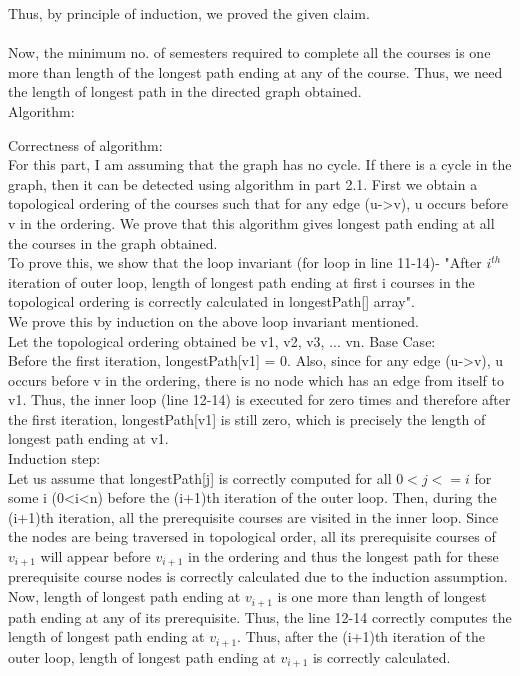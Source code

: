 \documentclass{article}
\begin{document}
Thus, by principle of induction, we proved the given claim.\\
\\
Now, the minimum no. of semesters required to complete all the courses is one more than length of the longest path ending at any of the course. Thus, we need the length of longest path in the directed graph obtained.\\
Algorithm:

Correctness of algorithm:\\
For this part, I am assuming that the graph has no cycle. If there is a cycle in the graph, then it can be detected using algorithm in part 2.1. First we obtain a topological ordering of the courses such that for any edge (u->v), u occurs before v in the ordering. We prove that this algorithm gives longest path ending at all the courses in the graph obtained.\\
To prove this, we show that the loop invariant (for loop in line 11-14)- "After $i^{th}$ iteration of outer loop, length of longest path ending at first i courses in the topological ordering is correctly calculated in longestPath[] array".\\
We prove this by induction on the above loop invariant mentioned.\\
Let the topological ordering obtained be v1, v2, v3, ... vn.
Base Case:\\
Before the first iteration, longestPath[v1] = 0. Also, since for any edge (u->v), u occurs before v in the ordering, there is no node which has an edge from itself to v1. Thus, the inner loop (line 12-14) is executed for zero times and therefore after the first iteration, longestPath[v1] is still zero, which is precisely the length of longest path ending at v1.\\
Induction step:\\
Let us assume that longestPath[j] is correctly computed for all $0<j<=i$ for some i (0<i<n) before the (i+1)th iteration of the outer loop. Then, during the (i+1)th iteration, all the prerequisite courses are visited in the inner loop. Since the nodes are being traversed in topological order, all its prerequisite courses of $v_{i+1}$ will appear before $v_{i+1}$ in the ordering and thus the longest path for these prerequisite course nodes is correctly calculated due to the induction assumption. Now, length of longest path ending at $v_{i+1}$ is one more than length of longest path ending at any of its prerequisite. Thus, the line 12-14 correctly computes the length of longest path ending at $v_{i+1}$. Thus, after the (i+1)th iteration of the outer loop, length of longest path ending at $v_{i+1}$ is correctly calculated.\\
\end{document}
